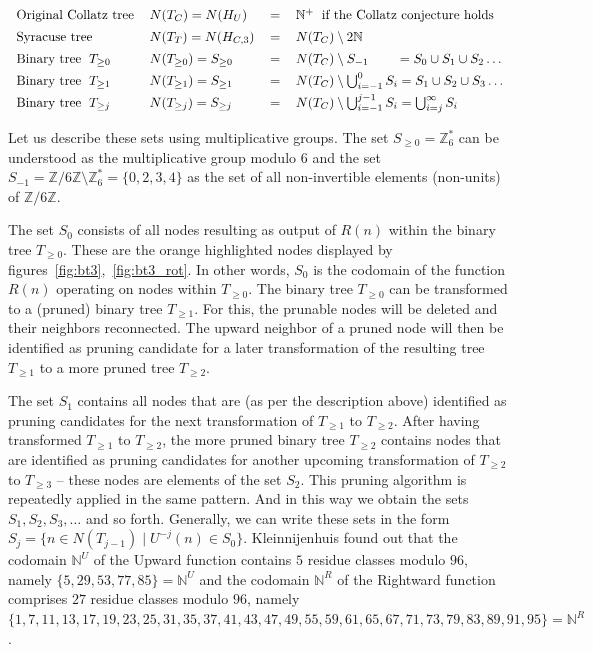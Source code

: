 \[\arraycolsep=0.6em\def\arraystretch{1.4}
\begin{array}{llll}
\text{Original Collatz tree} & N(T_C)=N(H_U)&=&\mathbb{N^+} \hspace{0.6em}\text{if the Collatz conjecture holds}\\
\text{Syracuse tree} & N(T_T)=N(H_{C,3})&=&N(T_C)\setminus2\mathbb{N}\\
\text{Binary tree}\hspace{0.6em}T_{\ge0}& N(T_{\ge0})=S_{\ge0}&=&N(T_C)\setminus S_{-1}\hspace{2.1em}=S_{0}\cup S_{1}\cup S_{2}\ldots\\
\text{Binary tree}\hspace{0.6em}T_{\ge1}& N(T_{\ge1})=S_{\ge1}&=&N(T_C)\setminus \bigcup_{i=-1}^{0}S_i=S_{1}\cup S_{2}\cup S_{3}\ldots\\
\text{Binary tree}\hspace{0.6em}T_{\ge j} & N(T_{\ge j})=S_{\ge j}&=&N(T_C)\setminus \bigcup_{i=-1}^{j-1}S_i=\bigcup_{i=j}^{\infty}S_i
\end{array}
\]

\par\medskip
Let us describe these sets using multiplicative groups. The set $S_{\ge0}=\mathbb{Z}^\ast_6$ can be understood as the multiplicative group modulo $6$ and the set $S_{-1}=\mathbb{Z}/6\mathbb{Z}\setminus\mathbb{Z}^\ast_6=\{0,2,3,4\}$ as the set of all non-invertible elements (non-units) of $\mathbb{Z}/6\mathbb{Z}$.

The set $S_0$ consists of all nodes resulting as output of $R(n)$ within the binary tree $T_{\ge0}$. These are the orange highlighted nodes displayed by figures~\ref{fig:bt3},~\ref{fig:bt3_rot}. In other words, $S_0$ is the codomain of the function $R(n)$ operating on nodes within $T_{\ge0}$. The binary tree $T_{\ge0}$ can be transformed to a (pruned) binary tree $T_{\ge1}$. For this, the prunable nodes will be deleted and their neighbors reconnected. The upward neighbor of a pruned node will then be identified as pruning candidate for a later transformation of the resulting tree $T_{\ge1}$ to a more pruned tree $T_{\ge2}$.

\par\medskip
The set $S_1$ contains all nodes that are (as per the description above) identified as pruning candidates for the next transformation of $T_{\ge1}$ to $T_{\ge2}$. After having transformed $T_{\ge1}$ to $T_{\ge2}$, the more pruned binary tree $T_{\ge2}$ contains nodes that are identified as pruning candidates for another upcoming transformation of $T_{\ge2}$ to $T_{\ge3}$ -- these nodes are elements of the set $S_2$. This pruning algorithm is repeatedly applied in the same pattern. And in this way we obtain the sets $S_1,S_2,S_3,\ldots$ and so forth. Generally, we can write these sets in the form $S_j=\{n\in N(T_{j-1})\mid U^{-j}(n)\in S_0\}$. Kleinnijenhuis found out that the codomain $\mathbb{N}^U$ of the Upward function contains $5$ residue classes modulo $96$, namely $\{5, 29, 53, 77, 85\}=\mathbb{N}^U$ and the codomain $\mathbb{N}^R$ of the Rightward function comprises $27$ residue classes modulo $96$, namely $\{1, 7, 11, 13, 17, 19, 23, 25, 31, 35, 37, 41, 43, 47, 49, 55, 59, 61, 65, 67, 71, 73, 79, 83, 89, 91, 95\}=\mathbb{N}^R$.

